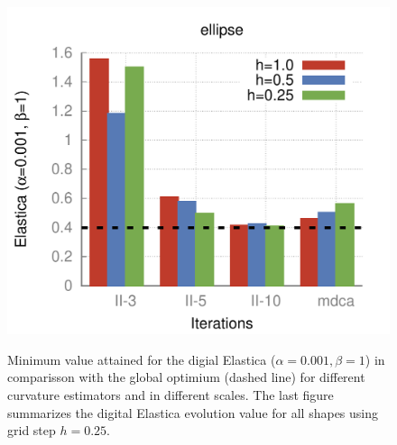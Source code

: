 \begin{figure}[]
{\includegraphics[scale=0.4]{figures/chapter5/flow/plots/bars/length_pen_0.00100/ellipse.pdf}
}\hspace{1em}%
%
\caption{Minimum value attained for the digial Elastica ($\alpha=0.001, \beta=1$) in comparisson with the global optimium (dashed line) for different curvature estimators and in different scales. The last figure summarizes the digital Elastica evolution value for all shapes using grid step $h=0.25$.}
\label{fig:local-comb-estimators-plots-lp0001}
\end{figure}


